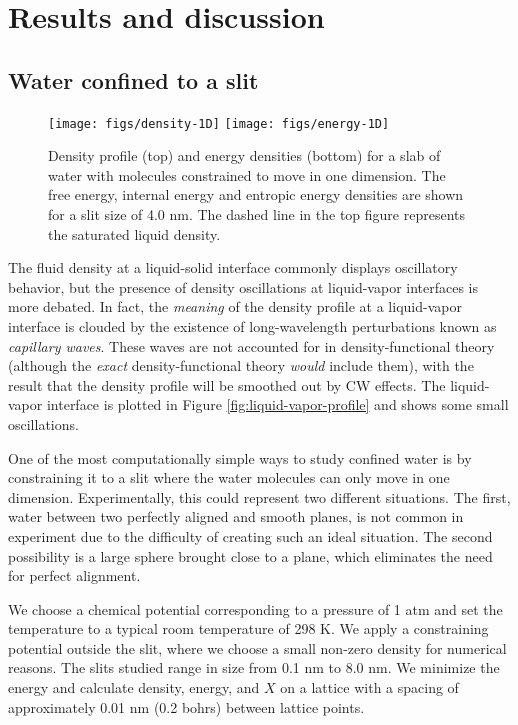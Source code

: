 \documentclass[letterpaper,twocolumn,amsmath,amssymb,prb]{revtex4-1}
\begin{document}
\section{Results and discussion}

\subsection{Water confined to a slit}

\begin{figure}
\begin{center}
\texttt{[image: figs/density-1D]}
\texttt{[image: figs/energy-1D]}
\end{center}
\caption{ Density profile (top) and 
energy densities (bottom) for a slab of water with molecules 
constrained to move in one dimension. The free energy, internal energy
and entropic energy densities are shown for a slit size of 4.0 nm. The dashed
line in the top figure represents the saturated liquid density.}
\label{fig:energy-1D}
\end{figure}

The fluid density at a liquid-solid interface commonly displays
oscillatory behavior, but the presence of density oscillations at
liquid-vapor interfaces is more debated\cite{penfold2001structure}.
In fact, the \emph{meaning} of the density profile at a liquid-vapor
interface is clouded by the existence of long-wavelength perturbations
known as \emph{capillary waves}.  These waves are not accounted for in
density-functional theory (although the \emph{exact}
density-functional theory \emph{would} include them), with the result
that the density profile will be smoothed out by CW effects. The liquid-vapor
interface is plotted in Figure \ref{fig:liquid-vapor-profile} and shows
some small oscillations.

One of the most computationally simple ways to study confined water is by
constraining it to a slit where the water molecules can only move in one
dimension. Experimentally, this could represent two different situations.
The first, water between two perfectly aligned and smooth planes, is not common 
in experiment due to the difficulty of creating such an ideal situation. The
second
possibility is a large sphere brought close to a plane, which eliminates the 
need for perfect alignment.

We choose a chemical potential corresponding to a pressure of 1 atm and set the
temperature to a typical room temperature of 298 K. We apply 
a constraining potential outside the slit, where we choose a small non-zero
density for numerical reasons. The slits studied range in size from 0.1 nm to 
8.0 nm. We minimize the energy and calculate density, energy, and $X$ on a
lattice
with a spacing of approximately 0.01 nm (0.2 bohrs) between lattice points.
\end{document}
